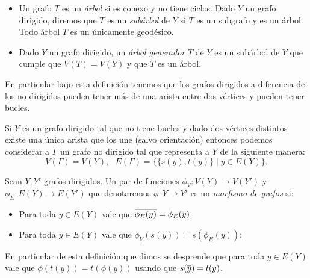 \documentclass[tesis.tex]{subfiles}
\begin{document}
\begin{deff}
\begin{itemize}
				
		\item Un grafo $T$ es un \emph{árbol} si es conexo y no tiene ciclos.
		Dado $Y$ un grafo dirigido, diremos que $T$ es un \emph{subárbol} de $Y$ si $T$ es un subgrafo y es un árbol. 
		Todo árbol $T$ es un únicamente geodésico.
		
		\item Dado $Y$ un grafo dirigido, un \emph{árbol generador} $T$ de $Y$ es un subárbol de $Y$ que cumple que $V(T) = V(Y)$ y que $T$ es un árbol.
		
		
	\end{itemize}
\end{deff}	

En particular bajo esta definición tenemos que los grafos dirigidos a diferencia de los no dirigidos pueden tener más de una arista entre dos vértices y pueden tener bucles.
%

Si $Y$ es un grafo dirigido tal que no tiene bucles y dado dos vértices distintos existe una única arista que los une (salvo orientación) entonces podemos considerar a $\Gamma$ un grafo no dirigido tal que representa a $Y$ de la siguiente manera:
\[
V(\Gamma) = V(Y), \ \ \ E(\Gamma) = \{ \{s(y), t(y) \} \mid y \in E(Y) \}.
\]






\begin{deff}
	Sean $Y, Y'$ grafos dirigidos. 
	Un par de funciones $\phi_V:V(Y) \to V(Y')$ y $\phi_E: E(Y) \to E(Y')$ que denotaremos $\phi:Y \to Y'$ es un \emph{morfismo de grafos} si:
	\begin{itemize}
		\item Para toda $y \in E(Y)$ vale que $\overline{\phi_{E}(y)} = \phi_{E}(\overline y)$;
		\item Para toda $y \in E(Y)$ vale que $\phi_{V}(s(y)) = s(\phi_{E}(y))$;
	\end{itemize}   
	En particular de esta definición que dimos se desprende que para toda $y \in E(Y)$ vale que $\phi(t(y)) = t(\phi(y))$ usando que $s(\overline y) = t(y)$.
\end{deff}
\end{document}
